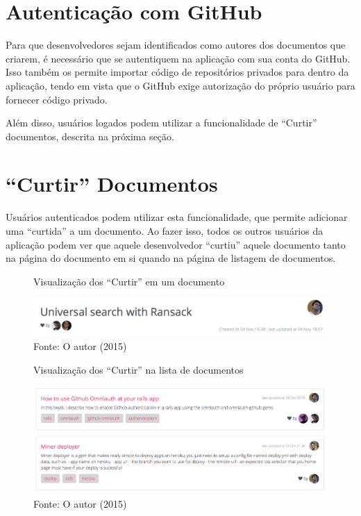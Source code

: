\section{Autenticação com GitHub}

Para que desenvolvedores sejam identificados como autores dos documentos que criarem, é necessário que se autentiquem na aplicação com sua conta do GitHub. Isso também os permite importar código de repositórios privados para dentro da aplicação, tendo em vista que o GitHub exige autorização do próprio usuário para fornecer código privado.

Além disso, usuários logados podem utilizar a funcionalidade de ``Curtir'' documentos, descrita na próxima seção.

\section{``Curtir'' Documentos}

Usuários autenticados podem utilizar esta funcionalidade, que permite adicionar uma ``curtida'' a um documento. Ao fazer isso, todos os outros usuários da aplicação podem ver que aquele desenvolvedor ``curtiu'' aquele documento tanto na página do documento em si quando na página de listagem de documentos.

\begin{figure}[h]
	\centering
    \caption{Visualização dos ``Curtir'' em um documento}
    \includegraphics[width=15cm]{Imagens/print-like-1.png}
	\caption*{Fonte: O autor (2015)}
\end{figure}

\begin{figure}[h]
	\centering
    \caption{Visualização dos ``Curtir'' na lista de documentos}
    \includegraphics[width=15cm]{Imagens/print-like-2.png}
	\caption*{Fonte: O autor (2015)}
\end{figure}

